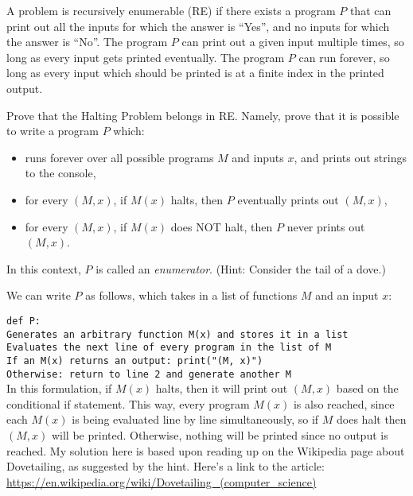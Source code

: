 \documentclass[11pt]{article}
\begin{document}
\begin{Parts}

\Part A problem is recursively enumerable (\textsf{RE}) if there exists a program $P$ that can print out all the inputs for which the answer is ``Yes'', and no inputs for which the answer is ``No''.
The program $P$ can print out a given input multiple times, so long as every input gets printed eventually. The program $P$ can run forever, so long as every input which should be printed is at a finite index in the printed output.

Prove that the Halting Problem belongs in \textsf{RE}. Namely, prove that it is possible to write a program $P$ which:
  \begin{itemize}
  \item runs forever over all possible programs $M$ and inputs $x$, and prints out strings to the console,
  \item for every $(M, x)$, if $M(x)$ halts, then $P$ eventually prints out $(M, x)$,
  \item for every $(M, x)$, if $M(x)$ does NOT halt, then $P$ never prints out $(M, x)$.
  \end{itemize}

In this context, $P$ is called an \emph{enumerator}.
(Hint: Consider the tail of a dove.)
\normalfont

\begin{solution}
  We can write $P$ as follows, which takes in a list of functions $M$ and an input $x$: 

  \texttt{def P: \\
    \phantom{aaa} Generates an arbitrary function M(x) and stores it in a list\\
    \phantom{aaaaa} Evaluates the next line of every program in the list of M\\
    \phantom{aaaaa} If an M(x) returns an output: print("(M, x)")\\
    \phantom{aaa} Otherwise: return to line 2 and generate another M}\\

  In this formulation, if $M(x)$ halts, then it will print out $(M, x)$ based on the conditional if statement. This way, every program $M(x)$ is also reached, since each $M(x)$ is being evaluated line by line simultaneously, so if $M$ does halt then $(M, x)$ will be printed. Otherwise, nothing will be printed since no output is reached. My solution here is based upon reading up on the Wikipedia page about Dovetailing, as suggested by the hint. Here's a link to the article: \href{https://en.wikipedia.org/wiki/Dovetailing_(computer_science)}{https://en.wikipedia.org/wiki/Dovetailing\_(computer\_science)}


\end{solution}
\end{Parts}
\end{document}

